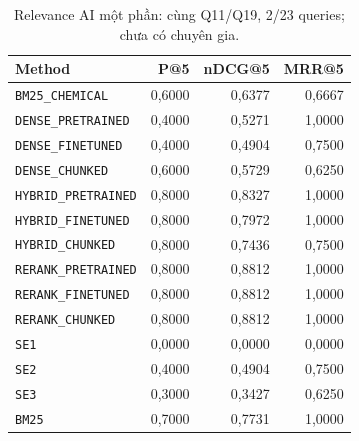 \begin{table}[H]\centering\small\setlength{\tabcolsep}{4pt}\renewcommand{\arraystretch}{1.16}
\caption{Relevance AI một phần: cùng Q11/Q19, 2/23 queries; chưa có chuyên gia.}\label{tab:relevance}
\begin{tabular}{p{.39\linewidth}rrr}
\toprule Method & P@5 & nDCG@5 & MRR@5 \\
\midrule
{\footnotesize\texttt{BM25\_CHEMICAL}} & 0,6000 & 0,6377 & 0,6667 \\
{\footnotesize\texttt{DENSE\_PRETRAINED}} & 0,4000 & 0,5271 & 1,0000 \\
{\footnotesize\texttt{DENSE\_FINETUNED}} & 0,4000 & 0,4904 & 0,7500 \\
{\footnotesize\texttt{DENSE\_CHUNKED}} & 0,6000 & 0,5729 & 0,6250 \\
{\footnotesize\texttt{HYBRID\_PRETRAINED}} & 0,8000 & 0,8327 & 1,0000 \\
{\footnotesize\texttt{HYBRID\_FINETUNED}} & 0,8000 & 0,7972 & 1,0000 \\
{\footnotesize\texttt{HYBRID\_CHUNKED}} & 0,8000 & 0,7436 & 0,7500 \\
{\footnotesize\texttt{RERANK\_PRETRAINED}} & 0,8000 & 0,8812 & 1,0000 \\
{\footnotesize\texttt{RERANK\_FINETUNED}} & 0,8000 & 0,8812 & 1,0000 \\
{\footnotesize\texttt{RERANK\_CHUNKED}} & 0,8000 & 0,8812 & 1,0000 \\
{\footnotesize\texttt{SE1}} & 0,0000 & 0,0000 & 0,0000 \\
{\footnotesize\texttt{SE2}} & 0,4000 & 0,4904 & 0,7500 \\
{\footnotesize\texttt{SE3}} & 0,3000 & 0,3427 & 0,6250 \\
{\footnotesize\texttt{BM25}} & 0,7000 & 0,7731 & 1,0000 \\
\bottomrule\end{tabular}
\end{table}
